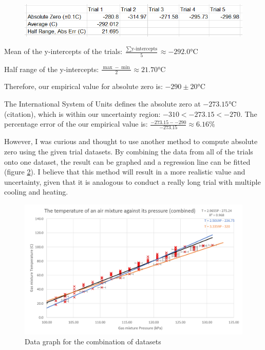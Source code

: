 \documentclass[a4paper,12pt]{article}
\begin{document}
\begin{figure}[H]
    \centering
    \includegraphics[width=\textwidth]{assets/azerodata.png}
    \label{fig:yi}
\end{figure}


Mean of the y-intercepts of the trials: $\frac{\sum \text{y-intercepts}}{5} \approx -292.0 \si{\celsius}$

Half range of the y-intercepts: $\frac{\max - \min}{2} \approx 21.70 \si{\celsius}$

Therefore, our empirical value for absolute zero is: $-290 \pm 20 \si{\celsius}$

The International System of Units defines the absolute zero at $-273.15\si{\celsius}$ (citation), which is within our uncertainty region: $-310 < -273.15 < -270$. The percentage error of the our empirical value is: $\frac{-273.15- -290}{-273.15} \approx 6.16\%$

However, I was curious and thought to use another method to compute absolute zero using the given trial datasets. By combining the data from all of the trials onto one dataset, the result can be graphed and a regression line can be fitted (figure \ref{fig:comb}). I believe that this method will result in a more realistic value and uncertainty, given that it is analogous to conduct a really long trial with multiple cooling and heating.

\begin{figure}[H]
    \centering
    \includegraphics[width=\textwidth]{assets/combinedgraph.png}
    \caption{Data graph for the combination of datasets}
    \label{fig:comb}
\end{figure}
\end{document}
